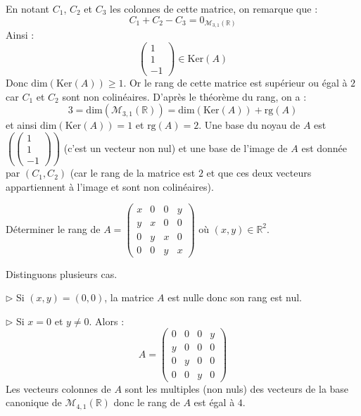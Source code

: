 \documentclass[a4paper,10pt]{report}
\begin{document}
\corr En notant $C_1$, $C_2$ et $C_3$ les colonnes de cette matrice, on remarque que :
$$C_1+C_2-C_3 = 0_{\mathcal{M}_{3,1}(\mathbb{R})}$$
Ainsi :
$$ \begin{pmatrix}
1 \\
1 \\
-1 
\end{pmatrix} \in \textrm{Ker}(A) $$
Donc $\textrm{dim}(\textrm{Ker}(A)) \geq 1$. Or le rang de cette matrice est supérieur ou égal à $2$ car $C_1$ et $C_2$ sont non colinéaires. D'après le théorème du rang, on a :
$$ 3=\textrm{dim}(\mathcal{M}_{3,1}(\mathbb{R})) = \textrm{dim}(\textrm{Ker}(A)) + \textrm{rg}(A)$$
et ainsi $\textrm{dim}(\textrm{Ker}(A)) = 1$ et $\textrm{rg}(A)=2$. Une base du noyau de $A$ est $\left(  \begin{pmatrix}
1 \\
1 \\
-1 
\end{pmatrix} \right)$ (c'est un vecteur non nul) et une base de l'image de $A$ est donnée par $(C_1,C_2)$ (car le rang de la matrice est $2$ et que ces deux vecteurs appartiennent à l'image et sont non colinéaires).

\begin{Exercice}{} Déterminer le rang de $A = \begin{pmatrix}
x & 0 & 0& y \\
y & x & 0 & 0 \\
0 & y & x & 0 \\
0 & 0 & y & x
\end{pmatrix}$ où $(x,y) \in \mathbb{R}^2$.
\end{Exercice} 

\corr Distinguons plusieurs cas.

\medskip

\noindent $\rhd$ Si $(x,y)=(0,0)$, la matrice $A$ est nulle donc son rang est nul.

\medskip

\noindent $\rhd$ Si $x=0$ et $y \neq 0$. Alors :
$$ A = \begin{pmatrix}
0 & 0 & 0& y \\
y & 0 & 0 & 0 \\
0 & y & 0 & 0 \\
0 & 0 & y & 0
\end{pmatrix}$$
Les vecteurs colonnes de $A$ sont les multiples (non nuls) des vecteurs de la base canonique de $\mathcal{M}_{4,1}(\mathbb{R})$ donc le rang de $A$ est égal à $4$.

\medskip
\end{document}
